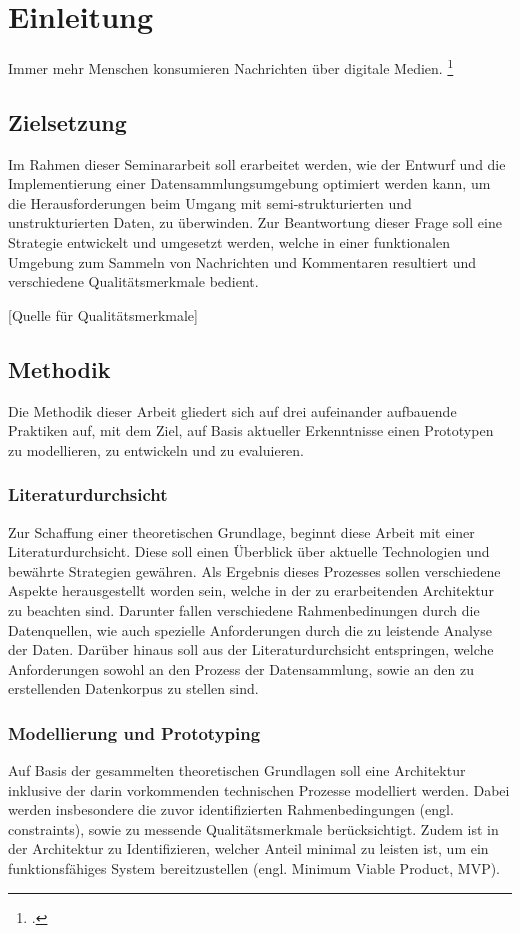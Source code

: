 \section{Einleitung} 
Immer mehr Menschen konsumieren Nachrichten über digitale Medien. \footcite [Vgl.][] {IfDAllensbach2023}

\subsection{Zielsetzung}
Im Rahmen dieser Seminararbeit soll erarbeitet werden, wie der Entwurf und die Implementierung einer Datensammlungsumgebung optimiert werden kann, um die Herausforderungen beim Umgang mit semi-strukturierten und unstrukturierten Daten, zu überwinden.
Zur Beantwortung dieser Frage soll eine Strategie entwickelt und umgesetzt werden, welche in einer funktionalen Umgebung zum Sammeln von Nachrichten und Kommentaren resultiert und verschiedene Qualitätsmerkmale bedient. 

[Quelle für Qualitätsmerkmale]

\subsection{Methodik}
Die Methodik dieser Arbeit gliedert sich auf drei aufeinander aufbauende Praktiken auf, mit dem Ziel, auf Basis aktueller Erkenntnisse einen Prototypen zu modellieren, zu entwickeln und zu evaluieren. 

\subsubsection{Literaturdurchsicht}
Zur Schaffung einer theoretischen Grundlage, beginnt diese Arbeit mit einer Literaturdurchsicht. Diese soll einen Überblick über aktuelle Technologien und bewährte Strategien gewähren. 
Als Ergebnis dieses Prozesses sollen verschiedene Aspekte herausgestellt worden sein, welche in der zu erarbeitenden Architektur zu beachten sind. Darunter fallen verschiedene Rahmenbedinungen durch die Datenquellen, wie auch spezielle Anforderungen durch die zu leistende Analyse der Daten.
Darüber hinaus soll aus der Literaturdurchsicht entspringen, welche Anforderungen sowohl an den Prozess der Datensammlung, sowie an den zu erstellenden Datenkorpus zu stellen sind. 

\subsubsection{Modellierung und Prototyping}
Auf Basis der gesammelten theoretischen Grundlagen soll eine Architektur inklusive der darin vorkommenden technischen Prozesse modelliert werden. 
Dabei werden insbesondere die zuvor identifizierten Rahmenbedingungen (engl. constraints), sowie zu messende Qualitätsmerkmale berücksichtigt. 
Zudem ist in der Architektur zu Identifizieren, welcher Anteil minimal zu leisten ist, um ein funktionsfähiges System bereitzustellen (engl. Minimum Viable Product, MVP). 

